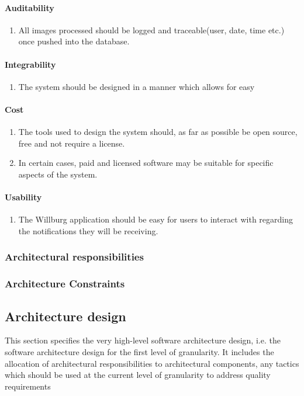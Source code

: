 \documentclass[a4paper,12pt]{report}
\begin{document}
\paragraph{Auditability}
\begin{enumerate}
	\item All images processed should be logged and traceable(user, date, time etc.) once pushed into the database.
\end{enumerate}
\paragraph{Integrability}
\begin{enumerate}
	\item The system should be designed in a manner which allows for easy 
\end{enumerate}
\paragraph{Cost}
\begin{enumerate}
	\item The tools used to design the system should, as far as possible be open source, free and not require a license.
	\item In certain cases, paid and licensed software may be suitable for specific aspects of the system. 
\end{enumerate}
\paragraph{Usability}
\begin{enumerate}
	\item The Willburg application should be easy for users to interact with regarding the notifications they will be receiving.
\end{enumerate}
\newpage

\subsubsection {Architectural responsibilities}
	
\subsubsection {Architecture Constraints}

\subsection {Architecture design}
This section specifies the very high-level software architecture design, i.e. the software architecture
design for the first level of granularity. It includes the allocation of architectural responsibilities to
architectural components, any tactics which should be used at the current level of granularity to
address quality requirements
\end{document}

